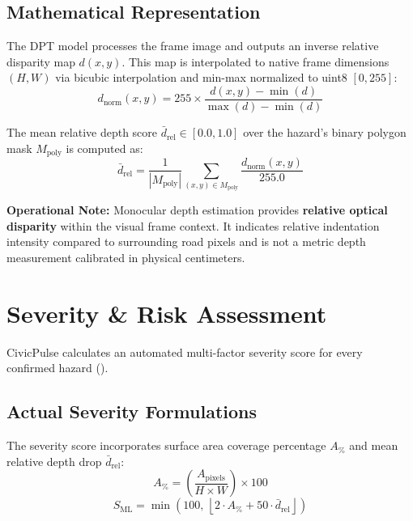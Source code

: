 \documentclass[12pt,a4paper]{article}
\begin{document}
\subsection{Mathematical Representation}
The DPT model processes the frame image and outputs an inverse relative disparity map $d(x, y)$. This map is interpolated to native frame dimensions $(H, W)$ via bicubic interpolation and min-max normalized to uint8 $[0, 255]$:
\begin{equation}
d_{\text{norm}}(x, y) = 255 \times \frac{d(x, y) - \min(d)}{\max(d) - \min(d)}
\end{equation}

The mean relative depth score $\bar{d}_{\text{rel}} \in [0.0, 1.0]$ over the hazard's binary polygon mask $M_{\text{poly}}$ is computed as:
\begin{equation}
\bar{d}_{\text{rel}} = \frac{1}{|M_{\text{poly}}|} \sum_{(x, y) \in M_{\text{poly}}} \frac{d_{\text{norm}}(x, y)}{255.0}
\end{equation}

\textbf{Operational Note:} Monocular depth estimation provides \textbf{relative optical disparity} within the visual frame context. It indicates relative indentation intensity compared to surrounding road pixels and is not a metric depth measurement calibrated in physical centimeters.

\section{Severity \& Risk Assessment}

CivicPulse calculates an automated multi-factor severity score for every confirmed hazard ().

\subsection{Actual Severity Formulations}
The severity score incorporates surface area coverage percentage $A_{\%}$ and mean relative depth drop $\bar{d}_{\text{rel}}$:
\begin{equation}
A_{\%} = \left(\frac{A_{\text{pixels}}}{H \times W}\right) \times 100
\end{equation}
\begin{equation}
S_{\text{ML}} = \min\left(100, \, \left\lfloor 2 \cdot A_{\%} + 50 \cdot \bar{d}_{\text{rel}} \right\rfloor \right)
\end{equation}
\end{document}
